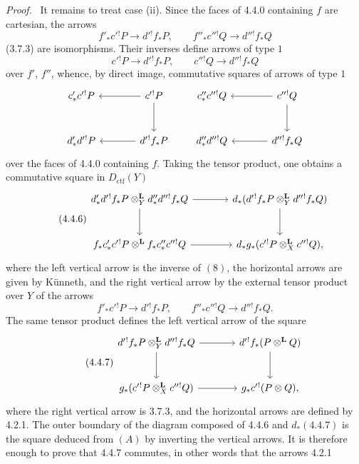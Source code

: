 \documentclass[11pt]{article}
\newenvironment{prooftext}[1][Proof]{\par\noindent\emph{#1.}\ }{\par\medskip}
\providecommand{\Dctf}{D_{\mathrm{ctf}}}
\begin{document}
\begin{prooftext}[Proof]
It remains to treat case (ii). Since the faces of 4.4.0 containing $f$ are cartesian, the arrows
\[
f'_*c'{}^!P\longrightarrow d'{}^!f_*P,\qquad
f''_*c''{}^!Q\longrightarrow d''{}^!f_*Q
\]
(3.7.3) are isomorphisms. Their inverses define arrows of type $1$
\[
c'{}^!P\longrightarrow d'{}^!f_*P,\qquad
c''{}^!Q\longrightarrow d''{}^!f_*Q
\]
over $f'$, $f''$, whence, by direct image, commutative squares of arrows of type $1$
\[
\begin{tikzcd}[column sep=large,row sep=large]
c'_*c'{}^!P & c'{}^!P\arrow[l]\arrow[d]\\
d'_*d'{}^!P & d'{}^!f_*P\arrow[l]
\end{tikzcd}
\qquad
\begin{tikzcd}[column sep=large,row sep=large]
c''_*c''{}^!Q & c''{}^!Q\arrow[l]\arrow[d]\\
d''_*d''{}^!Q & d''{}^!f_*Q\arrow[l]
\end{tikzcd}
\]
over the faces of 4.4.0 containing $f$. Taking the tensor product, one obtains a commutative square in $\Dctf(Y)$
\begin{equation}
\tag{4.4.6}
\begin{tikzcd}[column sep=large,row sep=large]
d'_*d'{}^!f_*P\otimes_Y^{\mathbf L}d''_*d''{}^!f_*Q
 \arrow[r]\arrow[d] &
d_*(d'{}^!f_*P\otimes_Y^{\mathbf L}d''{}^!f_*Q)\arrow[d]\\
f_*c'_*c'{}^!P\otimes^{\mathbf L}f_*c''_*c''{}^!Q
 \arrow[r] &
d_*g_*(c'{}^!P\otimes_X^{\mathbf L}c''{}^!Q),
\end{tikzcd}
\end{equation}
where the left vertical arrow is the inverse of $(8)$, the horizontal arrows are given by Künneth, and the right vertical arrow by the external tensor product over $Y$ of the arrows
\[
f'_*c'{}^!P\longrightarrow d'{}^!f_*P,\qquad
f''_*c''{}^!Q\longrightarrow d''{}^!f_*Q.
\]
The same tensor product defines the left vertical arrow of the square
\begin{equation}
\tag{4.4.7}
\begin{tikzcd}[column sep=large,row sep=large]
d'{}^!f_*P\otimes_Y^{\mathbf L}d''{}^!f_*Q
 \arrow[r]\arrow[d] &
d'{}^!f_*(P\otimes^{\mathbf L}Q)\arrow[d]\\
g_*(c'{}^!P\otimes_X^{\mathbf L}c''{}^!Q)
 \arrow[r] &
g_*c'{}^!(P\otimes Q),
\end{tikzcd}
\end{equation}
where the right vertical arrow is 3.7.3, and the horizontal arrows are defined by 4.2.1. The outer boundary of the diagram composed of 4.4.6 and $d_*(4.4.7)$ is the square deduced from $(A)$ by inverting the vertical arrows. It is therefore enough to prove that 4.4.7 commutes, in other words that the arrows 4.2.1

\end{prooftext}
\end{document}
